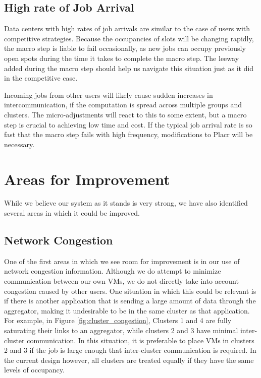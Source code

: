 \documentclass[11pt]{article}
\begin{document}
\subsection{High rate of Job Arrival}

Data centers with high rates of job arrivals are similar to the case of users with competitive strategies.  Because the occupancies of slots will be changing rapidly, the macro step is liable to fail occasionally, as new jobs can occupy previously open spots during the time it takes to complete the macro step. The leeway added during the macro step should help us navigate this situation just as it did in the competitive case.

Incoming jobs from other users will likely cause sudden increases in intercommunication, if the computation is spread across multiple groups and clusters.  The micro-adjustments will react to this to some extent, but a macro step is crucial to achieving low time and cost.  If the typical job arrival rate is so fast that the macro step fails with high frequency, modifications to Placr will be necessary.

\section{Areas for Improvement}

While we believe our system as it stands is very strong, we have also identified several areas in which it could be improved.

\subsection{Network Congestion}

One of the first areas in which we see room for improvement is in our use of network congestion information. Although we do attempt to minimize communication between our own VMs, we do not directly take into account congestion caused by other users.  One situation in which this could be relevant is if there is another application that is sending a large amount of data through the aggregator, making it undesirable to be in the same cluster as that application.  For example, in Figure \ref{fig:cluster_congestion}, Clusters 1 and 4 are fully saturating their links to an aggregator, while clusters 2 and 3 have minimal inter-cluster communication.  In this situation, it is preferable to place VMs in clusters 2 and 3 if the job is large enough that inter-cluster communication is required.  In the current design however, all clusters are treated equally if they have the same levels of occupancy.
\end{document}
